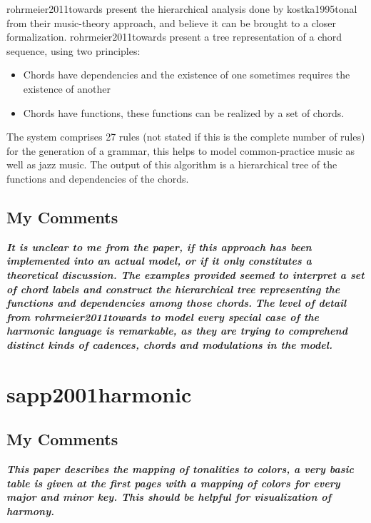   rohrmeier2011towards present the hierarchical analysis done by kostka1995tonal from their music-theory approach, and believe it can be brought to a closer formalization. rohrmeier2011towards present a tree representation of a chord sequence, using two principles:

  \begin{itemize}
    \item Chords have dependencies and the existence of one sometimes requires the existence of another
    \item Chords have functions, these functions can be realized by a set of chords.
  \end{itemize}

  The system comprises 27 rules (not stated if this is the complete number of rules) for the generation of a grammar, this helps to model common-practice music as well as jazz music. The output of this algorithm is a hierarchical tree of the functions and dependencies of the chords.

  \subsection{My Comments}
  \emph{\textbf{
    It is unclear to me from the paper, if this approach has been implemented into an actual model, or if it only constitutes a theoretical discussion. The examples provided seemed to interpret a set of chord labels and construct the hierarchical tree representing the functions and dependencies among those chords.
  }}
  \emph{\textbf{
    The level of detail from rohrmeier2011towards to model every special case of the harmonic language is remarkable, as they are trying to comprehend distinct kinds of cadences, chords and modulations in the model.
  }}


\section{sapp2001harmonic }
  \subsection{My Comments}
    \emph{\textbf{
      This paper describes the mapping of tonalities to colors, a very basic table is given at the first pages with a mapping of colors for every major and minor key. This should be helpful for visualization of harmony.
    }}

